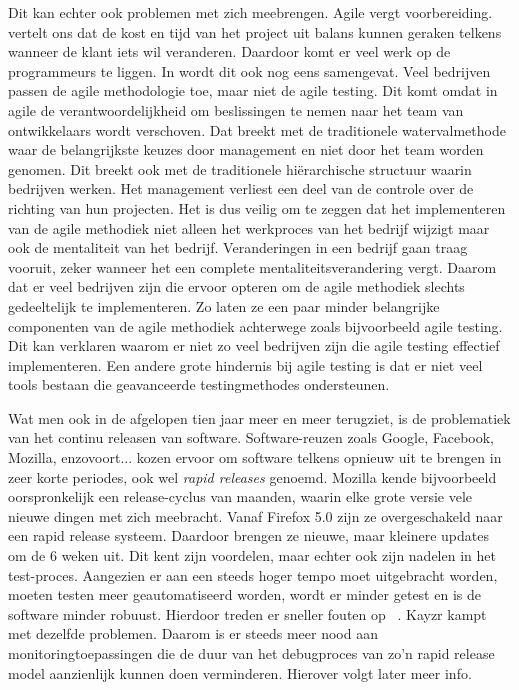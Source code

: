 Dit kan echter ook problemen met zich meebrengen. Agile vergt voorbereiding. \textcite{CHAKRAVORTY2014536} vertelt ons dat de kost en tijd van het project uit balans kunnen geraken telkens wanneer de klant iets wil veranderen. Daardoor komt er veel werk op de programmeurs te liggen. In \autocite{Borland2012} wordt dit ook nog eens samengevat. Veel bedrijven passen de agile methodologie toe, maar niet de agile testing. Dit komt omdat in agile de verantwoordelijkheid om beslissingen te nemen naar het team van ontwikkelaars wordt verschoven. Dat breekt met de traditionele watervalmethode waar de belangrijkste keuzes door management en niet door het team worden genomen. Dit breekt ook met de traditionele hiërarchische structuur waarin bedrijven werken. Het management verliest een deel van de controle over de richting van hun projecten. Het is dus veilig om te zeggen dat het implementeren van de agile methodiek niet alleen het werkproces van het bedrijf wijzigt maar ook de mentaliteit van het bedrijf. Veranderingen in een bedrijf gaan traag vooruit, zeker wanneer het een complete mentaliteitsverandering vergt. Daarom dat er veel bedrijven zijn die ervoor opteren om de agile methodiek slechts gedeeltelijk te implementeren. Zo laten ze een paar minder belangrijke componenten van de agile methodiek achterwege zoals bijvoorbeeld agile testing. Dit kan verklaren waarom er niet zo veel bedrijven zijn die agile testing effectief implementeren. Een andere grote hindernis bij agile testing is dat er niet veel tools bestaan die geavanceerde testingmethodes ondersteunen.

Wat men ook in de afgelopen tien jaar meer en meer terugziet, is de problematiek van het continu releasen van software. Software-reuzen zoals Google, Facebook, Mozilla, enzovoort... kozen ervoor om software telkens opnieuw uit te brengen in zeer korte periodes, ook wel \textit{rapid releases} genoemd. Mozilla kende bijvoorbeeld oorspronkelijk een release-cyclus van maanden, waarin elke grote versie vele nieuwe dingen met zich meebracht. Vanaf Firefox 5.0 zijn ze overgeschakeld naar een rapid release systeem. Daardoor brengen ze nieuwe, maar kleinere updates om de 6 weken uit. Dit kent zijn voordelen, maar echter ook zijn nadelen in het test-proces. Aangezien er aan een steeds hoger tempo moet uitgebracht worden, moeten testen meer geautomatiseerd worden, wordt er minder getest en is de software minder robuust. Hierdoor treden er sneller fouten op ~\autocite{Maentylae2013}. Kayzr kampt met dezelfde problemen. Daarom is er steeds meer nood aan monitoringtoepassingen die de duur van het debugproces van zo'n rapid release model aanzienlijk kunnen doen verminderen. Hierover volgt later meer info. 

